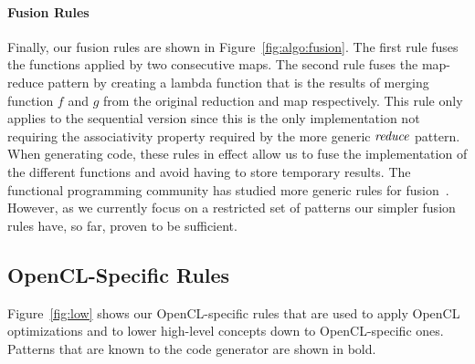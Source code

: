 \paragraph{Fusion Rules}
Finally, our fusion rules are shown in Figure~\ref{fig:algo:fusion}.
The first rule fuses the functions applied by two consecutive maps.
The second rule fuses the map-reduce pattern by creating a lambda function that is the results of merging function $f$ and $g$ from the original reduction and map respectively.
This rule only applies to the sequential version since this is the only implementation not requiring the associativity property required by the more generic $\textit{reduce}$ pattern.
When generating code, these rules in effect allow us to fuse the implementation of the different functions and avoid having to store temporary results.
The functional programming community has studied more generic rules for fusion~\cite{coutts07streamfusion,jones01playing}.
However, as we currently focus on a restricted set of patterns our simpler fusion rules have, so far, proven to be sufficient.






\subsection{OpenCL-Specific Rules}

Figure~\ref{fig:low} shows our OpenCL-specific rules that are used to apply OpenCL optimizations and to lower high-level concepts down to OpenCL-specific ones.
Patterns that are known to the code generator are shown in bold.%


